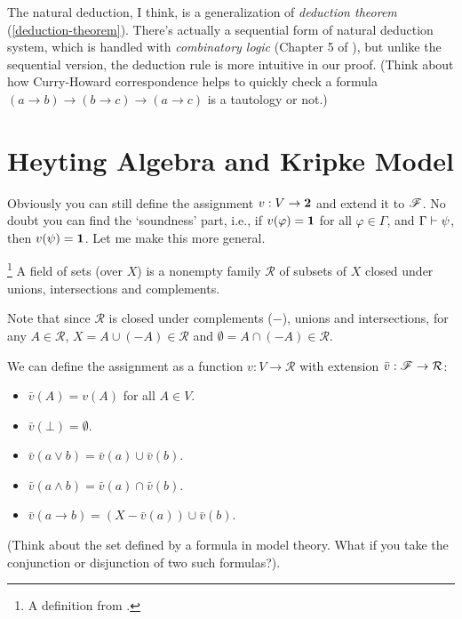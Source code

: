 The natural deduction, I think, is a generalization of {\it deduction theorem}
(\autoref{deduction-theorem}). There's actually a sequential form of natural
deduction system, which is handled with {\it combinatory logic} (Chapter 5
of \cite{Curry-Howard}), but unlike the sequential version, the deduction
rule is more intuitive in our proof. (Think about how Curry-Howard
correspondence helps to quickly check a formula 
$(a\to b)\to (b\to c)\to(a\to c)$ is a tautology or not.)

\section{Heyting Algebra and Kripke Model}
Obviously you can still define the assignment $v:V\to\mathbf{2}$ and extend
it to $\mathscr{F}$. No doubt you can find the `soundness' part, i.e.,
if $v(\varphi)=\mathbf{1}$ for all $\varphi\in\Gamma$, and $\Gamma\vdash\psi$,
then $v(\psi)=\mathbf{1}$. Let me make this more general.
\begin{definition}\footnote{A definition from \cite{Curry-Howard}.}
    A field of sets (over $X$) is a nonempty family $\mathcal{R}$ of
    subsets of $X$ closed under unions, intersections and complements. 
\end{definition}
Note that since $\mathcal{R}$ is closed under complements ($-$), unions 
and intersections, for any $A\in\mathcal{R}$, $X=A\cup(-A)\in\mathcal{R}$
and $\emptyset=A\cap(-A)\in\mathcal{R}$.

We can define the assignment as a function $v: V\to\mathcal{R}$ with
extension $\bar{v}:\mathscr{F}\to\mathcal{R}$:
\begin{itemize}
    \item $\bar{v}(A)=v(A)$ for all $A\in V$.
    \item $\bar{v}(\bot)=\emptyset$.
    \item $\bar{v}(a\vee b)=\bar{v}(a)\cup \bar{v}(b)$.
    \item $\bar{v}(a\wedge b)=\bar{v}(a)\cap \bar{v}(b)$.
    \item $\bar{v}(a\to b)=(X-\bar{v}(a))\cup \bar{v}(b)$.
\end{itemize}

(Think about the set defined by a formula in model theory. What if you
take the conjunction or disjunction of two such formulas?).

